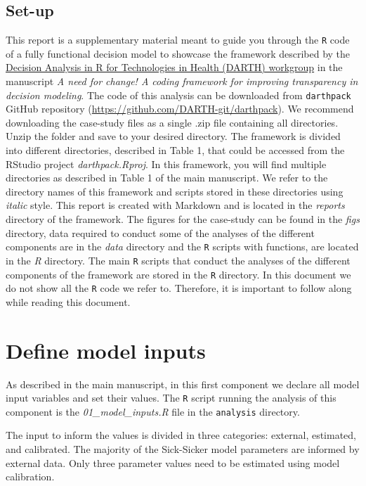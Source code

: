 \documentclass[
]{book}
\begin{document}
\section*{Set-up}\label{set-up}

This report is a supplementary material meant to guide you through the \texttt{R} code of a fully functional decision model to showcase the framework described by the \href{http://darthworkgroup.com/}{Decision Analysis in R for Technologies in Health (DARTH) workgroup} in the manuscript \emph{A need for change! A coding framework for improving transparency in decision modeling}. The code of this analysis can be downloaded from \texttt{darthpack} GitHub repository (\url{https://github.com/DARTH-git/darthpack}). We recommend downloading the case-study files as a single .zip file containing all directories. Unzip the folder and save to your desired directory. The framework is divided into different directories, described in Table 1, that could be accessed from the RStudio project \emph{darthpack.Rproj}. In this framework, you will find multiple directories as described in Table 1 of the main manuscript. We refer to the directory names of this framework and scripts stored in these directories using \emph{italic} style. This report is created with Markdown and is located in the \emph{reports} directory of the framework. The figures for the case-study can be found in the \emph{figs} directory, data required to conduct some of the analyses of the different components are in the \emph{data} directory and the \texttt{R} scripts with functions, are located in the \emph{R} directory. The main \texttt{R} scripts that conduct the analyses of the different components of the framework are stored in the \texttt{R} directory. In this document we do not show all the \texttt{R} code we refer to. Therefore, it is important to follow along while reading this document.

\chapter{Define model inputs}\label{inputs}

As described in the main manuscript, in this first component we declare all model input variables and set their values. The \texttt{R} script running the analysis of this component is the \emph{01\_model\_inputs.R} file in the \texttt{analysis} directory.

The input to inform the values is divided in three categories: external, estimated, and calibrated. The majority of the Sick-Sicker model parameters are informed by external data. Only three parameter values need to be estimated using model calibration.
\end{document}
